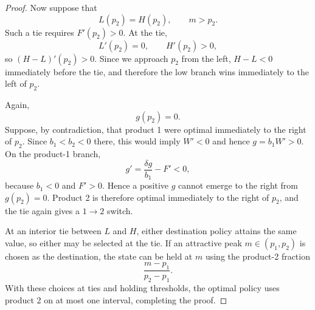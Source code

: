 \documentclass[11pt]{article}
\begin{document}
\begin{proof}
Now suppose that
\begin{equation*}
    L(p_2)=H(p_2),\qquad m>p_2.
\end{equation*}
Such a tie requires $F'(p_2)>0$. At the tie,
\begin{equation*}
    L'(p_2)=0,
    \qquad
    H'(p_2)>0,
\end{equation*}
so $(H-L)'(p_2)>0$. Since we approach $p_2$ from the left,
$H-L<0$ immediately before the tie, and therefore the low branch wins immediately to the left of $p_2$.

Again,
\begin{equation*}
    g(p_2)=0.
\end{equation*}
Suppose, by contradiction, that product 1 were optimal immediately to the right of $p_2$. Since $b_1<b_2<0$ there, this would imply $W'<0$ and hence $g=b_1W'>0$. On the product-1 branch,
\begin{equation*}
    g'=\frac{\delta g}{b_1}-F'<0,
\end{equation*}
because $b_1<0$ and $F'>0$. Hence a positive $g$ cannot emerge to the right from $g(p_2)=0$. Product 2 is therefore optimal immediately to the right of $p_2$, and the tie again gives a $1\to2$ switch.

\begin{figure}[H]
\centering
{}
\end{figure}

At an interior tie between $L$ and $H$, either destination policy attains the same value, so either may be selected at the tie. If an attractive peak $m\in(p_1,p_2)$ is chosen as the destination, the state can be held at $m$ using the product-2 fraction
\begin{equation*}
    \frac{m-p_1}{p_2-p_1}.
\end{equation*}
With these choices at ties and holding thresholds, the optimal policy uses product 2 on at most one interval, completing the proof.
\end{proof}
\end{document}
